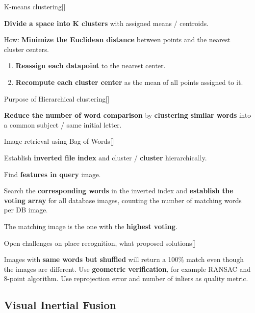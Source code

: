 \documentclass[10pt,a4paper]{scrartcl}
\begin{document}
\begin{multicols*}{2}
\begin{QandA}{K-means clustering}[\Definition]
\item \textbf{Divide a space into K clusters} with assigned means / centroids.
\item How: \textbf{Minimize the Euclidean distance} between points and the nearest cluster centers.
\begin{enumerate}
\item \textbf{Reassign each datapoint} to the nearest center.
\item \textbf{Recompute each cluster center} as the mean of all points assigned to it.
\end{enumerate}
\end{QandA}

\begin{QandA}{Purpose of Hierarchical clustering}[\Application]
\item \textbf{Reduce the number of word comparison} by \textbf{clustering similar words} into a common subject / same initial letter.
\end{QandA}

\begin{QandA}{Image retrieval using Bag of Words}[\Derivation]
\item Establish \textbf{inverted file index} and cluster / \textbf{cluster} hierarchically.
\item Find \textbf{features in query} image.
\item Search the \textbf{corresponding words} in the inverted index and \textbf{establish the voting array} for all database images, counting the number of matching words per DB image.
\item The matching image is the one with the \textbf{highest voting}.
\end{QandA}

\begin{QandA}{Open challenges on place recognition, what proposed solutions}[\Application]
\item Images with \textbf{same words but shuffled} will return a 100\% match even though the images are different. Use \textbf{geometric verification}, for example RANSAC and 8-point algorithm. Use reprojection error and number of inliers as quality metric.
\end{QandA}

\subsection*{Visual Inertial Fusion}


\end{multicols*}
\end{document}
